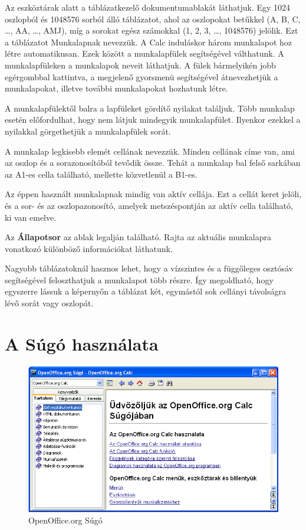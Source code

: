 Az eszköztárak alatt a táblázatkezelő dokumentumablakát
láthatjuk. Egy 1024 oszlopból és 1048576 sorból álló
táblázatot, ahol az oszlopokat betűkkel (A, B, C, {\dots}, AA,
{\dots}, AMJ), míg a sorokat egész számokkal (1, 2, 3, {\dots},
1048576) jelölik. Ezt a táblázatot Munkalapnak nevezzük. A Calc
induláskor három munkalapot hoz létre automatikusan. Ezek
között a munkalapfülek segítségével válthatunk. A
munkalapfüleken a munkalapok neveit láthatjuk. A fülek
bármelyikén jobb egérgombbal kattintva, a megjelenő
gyorsmenü segítségével átnevezhetjük a munkalapokat,
illetve további munkalapokat hozhatunk létre.

A munkalapfülektől balra a lapfüleket gördítő nyilakat
találjuk. Több munkalap esetén előfordulhat, hogy nem
látjuk mindegyik munkalapfület. Ilyenkor ezekkel a nyilakkal
görgethetjük a munkalapfülek sorát.

A munkalap legkisebb elemét cellának nevezzük. Minden cellának
címe van, ami az oszlop és a sorazonosítóból tevődik
össze. Tehát a munkalap bal felső sarkában az A1-es cella
található, mellette közvetlenül a B1-es.

Az éppen használt munkalapnak mindig van aktív cellája. Ezt a
cellát keret jelöli, és a sor- és az oszlopazonosító,
amelyek metszéspontján az aktív cella található, ki van
emelve.

Az \textbf{Állapotsor} az ablak legalján található. Rajta az
aktuális munkalapra vonatkozó különböző információkat
láthatunk.

Nagyobb táblázatoknál hasznos lehet, hogy a vízszintes és a
függőleges osztósáv segítségével feloszthatjuk a
munkalapot több részre. Így megoldható, hogy egyszerre lássuk
a képernyőn a táblázat két, egymástól sok cellányi
távolságra lévő sorát vagy oszlopát.  


\section{A Súgó használata}

\begin{figure}[!h]
\begin{center}
\includegraphics[width=15.999cm]{oocalcv2-img3.png}
\caption{OpenOffice.org Súgó}\label{Súgó}
\end{center}
\end{figure}

